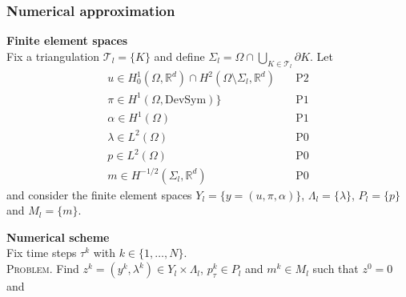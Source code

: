 \documentclass[8pt]{beamer}
\numberwithin{equation}{section}
\theoremstyle{definition}
\begin{document}
\begin{frame}
\frametitle{Numerical approximation}
\centering
\begin{minipage}[c]{0.42\textwidth}
\textbf{Finite element spaces}
\\[0.5em]
Fix a triangulation $\mathcal{T}_l=\{K\}$ and define $\Sigma_l=\Omega\cap\bigcup_{K\in\mathcal{T}_l}\partial K$. Let
\begin{align*}
u\in H^1_0(\Omega,\mathbb{R}^d)\cap H^2(\Omega\setminus\Sigma_l,\mathbb{R}^d)&\quad\text{P2} \\
\pi\in H^1(\Omega,\text{DevSym})\}&\quad\text{P1} \\
\alpha\in H^1(\Omega)&\quad\text{P1} \\
\lambda\in L^2(\Omega)&\quad\text{P0} \\
p\in L^2(\Omega)&\quad\text{P0} \\
m\in H^{-1/2}(\Sigma_l,\mathbb{R}^d)&\quad\text{P0}
\end{align*}
and consider the finite element spaces $Y_l=\{y=(u,\pi,\alpha)\}$, $\Lambda_l=\{\lambda\}$, $P_l=\{p\}$ and $M_l=\{m\}$.
\\[0em]
\begin{center}
\hspace{0.06\textwidth}
\end{center}
\end{minipage}
\hspace{0.02\textwidth}
\begin{minipage}[c]{0.54\textwidth}
\textbf{Numerical scheme}
\\[0.5em]
Fix time steps $\tau^k$ with $k\in\{1,\dots,N\}$.
\\[0.5em]
\textsc{Problem.} Find $z^k=(y^k,\lambda^k)\in Y_l\times\Lambda_l$, $p_\tau^k\in P_l$ and $m^k\in M_l$ such that $z^0=0$ and

\end{minipage}
\end{frame}
\end{document}

